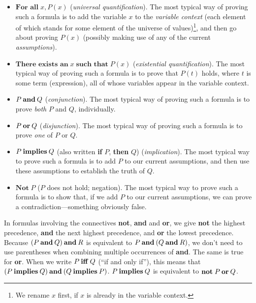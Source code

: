\begin{itemize}
\item $\textbf{For all}\; x, P(x)$ (\emph{universal
%
%
    quantification}). The most typical way of proving such a formula
  is to add the variable $x$ to the \emph{variable context} (each
%
%
  element of which stands for some element of the universe of
  values)\footnote{We rename $x$ first, if $x$ is already in the
    variable context.}, and then go about proving $P(x)$ (possibly
  making use of any of the current \emph{assumptions}).
%
%

\item $\textbf{There exists an}\; x \;\textbf{such that}\; P(x)$
  (\emph{existential quantification}).  The most typical way of
%
%
  proving such a formula is to prove that $P(t)$ holds, where $t$ is
  some term (expression), all of whose variables appear in the
  variable context.

\item $P \mathbin{\mathbf{and}} Q$ (\emph{conjunction}). The most typical way of
%
%
  proving such a formula is to prove \emph{both} $P$ and $Q$, individually.

\item $P \mathbin{\mathbf{or}} Q$ (\emph{disjunction}). The most typical way
%
%
  of proving such a formula is to prove \emph{one} of $P$ or $Q$.

\item $P \mathbin{\mathbf{implies}} Q$ (also written \textbf{if} $P$,
  \textbf{then} $Q$) (\emph{implication}).  The most typical way to
%
%
  prove such a formula is to add $P$ to our current assumptions, and
  then use these assumptions to establish the truth of $Q$.

\item $\textbf{Not}\; P$ ($P$ does not hold; negation). The most typical
%
%
  way to prove such a formula is to show that, if we add $P$ to our
  current assumptions, we can prove a contradiction---something obviously
  false.
\end{itemize}

In formulas involving the connectives \textbf{not}, \textbf{and} and
\textbf{or}, we give \textbf{not} the highest precedence, \textbf{and}
the next highest precedence, and \textbf{or} the lowest
precedence. Because $(P \mathbin{\mathbf{and}} Q) \mathbin{\mathbf{and}} R$ is
equivalent to $P \mathbin{\mathbf{and}} (Q \mathbin{\mathbf{and}} R)$, we don't need
to use parentheses when combining multiple occurrences of
\textbf{and}.  The same is true for \textbf{or}.
When we write $P \mathbin{\mathbf{iff}} Q$ (``if and only if''), this means that
$(P \mathbin{\mathbf{implies}} Q) \mathbin{\mathbf{and}} (Q \mathbin{\mathbf{implies}} P)$.  $P \mathbin{\mathbf{implies}} Q$
is equivalent to $\textbf{not}\;P \mathbin{\mathbf{or}} Q$.

